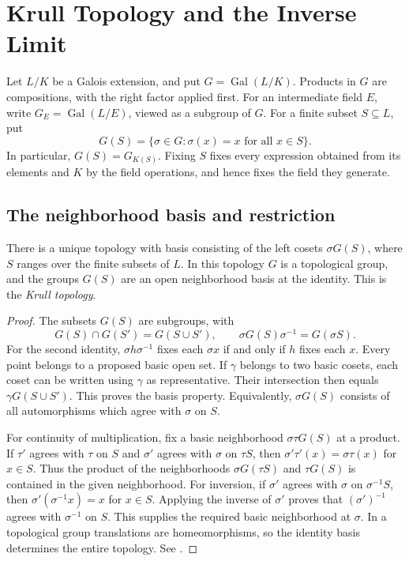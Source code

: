\chapter{Krull Topology and the Inverse Limit}\label{ch:krull-topology}

Let \(L/K\) be a Galois extension, and put
\(G=\operatorname{Gal}(L/K)\). Products in \(G\) are compositions,
with the right factor applied first. For an intermediate field \(E\),
write \(G_E=\operatorname{Gal}(L/E)\), viewed as a subgroup of \(G\).
For a finite subset \(S\subseteq L\), put
\[
 G(S)=\{\sigma\in G:\sigma(x)=x\text{ for all }x\in S\}.
\]
In particular, \(G(S)=G_{K(S)}\). Fixing \(S\) fixes every expression
obtained from its elements and \(K\) by the field operations, and hence
fixes the field they generate.

\section{The neighborhood basis and restriction}

\begin{proposition}\label{res:T01}
There is a unique topology with basis consisting of the left cosets
\(\sigma G(S)\), where \(S\) ranges over the finite subsets of \(L\).
In this topology \(G\) is a topological group, and the groups \(G(S)\)
are an open neighborhood basis at the identity. This is the
\emph{Krull topology}.
\end{proposition}

\begin{proof}
The subsets \(G(S)\) are subgroups, with
\[
 G(S)\cap G(S')=G(S\cup S'),\qquad
 \sigma G(S)\sigma^{-1}=G(\sigma S).
\]
For the second identity, \(\sigma h\sigma^{-1}\) fixes each \(\sigma x\)
if and only if \(h\) fixes each \(x\). Every point belongs to a proposed
basic open set. If \(\gamma\) belongs to two basic cosets, each coset can
be written using \(\gamma\) as representative. Their intersection then
equals \(\gamma G(S\cup S')\). This proves the basis property.
Equivalently, \(\sigma G(S)\) consists of all automorphisms which agree
with \(\sigma\) on \(S\).

For continuity of multiplication, fix a basic neighborhood
\(\sigma\tau G(S)\) at a product. If \(\tau'\) agrees with \(\tau\) on
\(S\) and \(\sigma'\) agrees with \(\sigma\) on \(\tau S\), then
\(\sigma'\tau'(x)=\sigma\tau(x)\) for \(x\in S\). Thus the product of
the neighborhoods \(\sigma G(\tau S)\) and \(\tau G(S)\) is contained
in the given neighborhood. For inversion, if \(\sigma'\) agrees
with \(\sigma\) on \(\sigma^{-1}S\), then
\(\sigma'(\sigma^{-1}x)=x\) for \(x\in S\). Applying the inverse of
\(\sigma'\) proves that \((\sigma')^{-1}\) agrees with \(\sigma^{-1}\)
on \(S\). This supplies the required basic neighborhood at \(\sigma\).
In a topological group translations are homeomorphisms, so the identity
basis determines the entire topology. See
\cite[Section 7, following 7.2, and Proposition 7.6]{milne}.
\end{proof}

